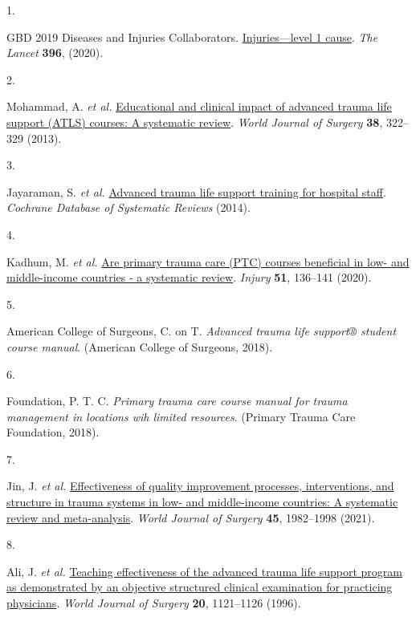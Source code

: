 \documentclass[
]{article}
\newlength{\cslhangindent}
\newlength{\csllabelwidth}
\newlength{\cslentryspacingunit} %
\newenvironment{CSLReferences}[2] %
 {%
  \setlength{\parindent}{0pt}
  \ifodd #1
  \let\oldpar\par
  \def\par{\hangindent=\cslhangindent\oldpar}
  \fi
  \setlength{\parskip}{#2\cslentryspacingunit}
 }%
 {}
\newcommand{\CSLLeftMargin}[1]{\parbox[t]{\csllabelwidth}{#1}}
\newcommand{\CSLRightInline}[1]{\parbox[t]{\linewidth - \csllabelwidth}{#1}\break}
\begin{document}
\hypertarget{refs}{}
\begin{CSLReferences}{0}{0}
\leavevmode{}%
\CSLLeftMargin{1. }
\CSLRightInline{GBD 2019 Diseases and Injuries Collaborators. \href{}{Injuries---level 1 cause}. \emph{The Lancet} \textbf{396}, (2020).}

\leavevmode{}%
\CSLLeftMargin{2. }
\CSLRightInline{Mohammad, A. \emph{et al.} \href{https://doi.org/10.1007/s00268-013-2294-0}{Educational and clinical impact of advanced trauma life support (ATLS) courses: A systematic review}. \emph{World Journal of Surgery} \textbf{38}, 322--329 (2013).}

\leavevmode{}%
\CSLLeftMargin{3. }
\CSLRightInline{Jayaraman, S. \emph{et al.} \href{https://doi.org/10.1002/14651858.cd004173.pub4}{Advanced trauma life support training for hospital staff}. \emph{Cochrane Database of Systematic Reviews} (2014).}

\leavevmode{}%
\CSLLeftMargin{4. }
\CSLRightInline{Kadhum, M. \emph{et al.} \href{https://doi.org/10.1016/j.injury.2019.10.084}{Are primary trauma care (PTC) courses beneficial in low- and middle-income countries - a systematic review}. \emph{Injury} \textbf{51}, 136--141 (2020).}

\leavevmode{}%
\CSLLeftMargin{5. }
\CSLRightInline{American College of Surgeons, C. on T. \emph{Advanced trauma life support® student course manual}. (American College of Surgeons, 2018).}

\leavevmode{}%
\CSLLeftMargin{6. }
\CSLRightInline{Foundation, P. T. C. \emph{Primary trauma care course manual for trauma management in locations wih limited resources}. (Primary Trauma Care Foundation, 2018).}

\leavevmode{}%
\CSLLeftMargin{7. }
\CSLRightInline{Jin, J. \emph{et al.} \href{https://doi.org/10.1007/s00268-021-06065-9}{Effectiveness of quality improvement processes, interventions, and structure in trauma systems in low- and middle-income countries: A systematic review and meta-analysis}. \emph{World Journal of Surgery} \textbf{45}, 1982--1998 (2021).}

\leavevmode{}%
\CSLLeftMargin{8. }
\CSLRightInline{Ali, J. \emph{et al.} \href{https://doi.org/10.1007/s002689900171}{Teaching effectiveness of the advanced trauma life support program as demonstrated by an objective structured clinical examination for practicing physicians}. \emph{World Journal of Surgery} \textbf{20}, 1121--1126 (1996).}


\end{CSLReferences}
\end{document}
